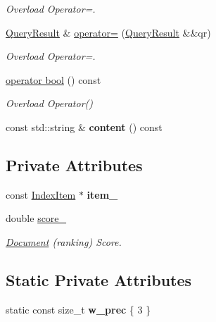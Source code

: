 \begin{DoxyCompactItemize}
\begin{DoxyCompactList}\small\item\em Overload Operator=. \end{DoxyCompactList}\item 
\hyperlink{class_query_result}{Query\+Result} \& \hyperlink{class_query_result_a61fe09a36b729072cf8db7d36fbd57ba}{operator=} (\hyperlink{class_query_result}{Query\+Result} \&\&qr)
\begin{DoxyCompactList}\small\item\em Overload Operator=. \end{DoxyCompactList}\item 
\hyperlink{class_query_result_a7802d975b87856e0c213575258e0f4c0}{operator bool} () const
\begin{DoxyCompactList}\small\item\em Overload Operator() \end{DoxyCompactList}\item 
\mbox{\label{class_query_result_af5577f4385769796fe8ff1dc99b83215}} 
const std\+::string \& {\bfseries content} () const
\end{DoxyCompactItemize}
\subsection*{Private Attributes}
\begin{DoxyCompactItemize}
\item 
\mbox{\label{class_query_result_af34df0a7a6ae86b5eba712e3be297da3}} 
const \hyperlink{class_index_item}{Index\+Item} $\ast$ {\bfseries item\+\_\+}
\item 
\mbox{\label{class_query_result_abc28ed6816fe64438a1c4a9dcc3d802d}} 
double \hyperlink{class_query_result_abc28ed6816fe64438a1c4a9dcc3d802d}{score\+\_\+}
\begin{DoxyCompactList}\small\item\em \hyperlink{class_document}{Document} (ranking) Score. \end{DoxyCompactList}\end{DoxyCompactItemize}
\subsection*{Static Private Attributes}
\begin{DoxyCompactItemize}
\item 
\mbox{\label{class_query_result_aee8d99732fbc64cfb0c8fc5ff84baf99}} 
static const size\+\_\+t {\bfseries w\+\_\+prec} \{ 3 \}
\end{DoxyCompactItemize}
